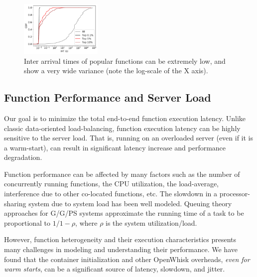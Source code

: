 \begin{figure}
  \includegraphics[width=0.35\textwidth]{../figs/iats-all.pdf}
  \caption{Inter arrival times of popular functions can be extremely low, and show a very wide variance (note the log-scale of the X axis).}
  \label{fig:iats}
\end{figure}

\subsection{Function Performance and Server Load}
\label{subsec:function-perf}

Our goal is to minimize the total end-to-end function execution latency. 
Unlike classic data-oriented load-balancing, function execution latency can be highly sensitive to the server load.
That is, running on an overloaded server (even if it is a warm-start), can result in significant latency increase and performance degradation.

Function performance can be affected by many factors such as the number of concurrently running functions, the CPU utilization, the load-average, interference due to other co-located functions, etc.
The slowdown in a processor-sharing system due to system load has been well modeled.
Queuing theory approaches for G/G/PS systems approximate the running time of a task to be proportional to $1/1-\rho$, where $\rho$ is the system utilization/load.

However, function heterogeneity and their execution characteristics presents many challenges in modeling and understanding their performance.
We have found that the container initialization and other OpenWhisk overheads, \emph{even for warm starts}, can be a significant source of latency, slowdown, and jitter. 

